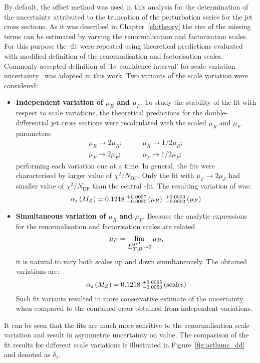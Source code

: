 By default, the offset method was used in this analysis for the determination of the uncertainty attributed to the truncation of the perturbation series for the jet cross sections. As it was described in Chapter~\ref{ch:theory} the size of the missing terms can be estimated by varying the renormalisation and factorisation scales. For this purpose the \asz-fit were repeated using theoretical predictions evaluated with modified definition of the renormalisation and factorisation scales. Commonly accepted definition of '1$\sigma$ confidence interval' for scale variation uncertainty~\cite{soper:1997} was adopted in this work. Two variants of the scale variation were considered:
\begin{itemize}
 \item \textbf{Independent variation of $\mu_R$ and $\mu_F$}. To study the stability of the fit with respect to scale variations, the theoretical predictions for the double-differential jet cross sections were recalculated with the scaled $\mu_R$ and $\mu_F$ parameters:
\begin{align}
 \mu_R \rightarrow 2\mu_R;&\qquad \mu_R \rightarrow 1/2\mu_R;\\
 \mu_F \rightarrow 2\mu_F;&\qquad \mu_F \rightarrow 1/2\mu_F;
\end{align}
performing each variation one at a time. In general, the fits were characterised by larger value of $\chi^2/N_\text{DF}$. Only the fit with $\mu_F \rightarrow 2\mu_F$ had smaller value of $\chi^2/N_\text{DF}$ than the central \asz-fit. The resulting variation of \asz was:
\begin{equation}
 \mbox{$\alpha_{s}\left(M_{Z}\right)$} = 0.1218\;^{+0.0057}_{-0.0050}\left(\mu_R\right)\;^{+0.0003}_{-0.0003}\left(\mu_F\right)
\end{equation}
\item \textbf{Simultaneous variation of $\mu_R$ and $\mu_F$}. Because the analytic expressions for the renormalisation and factorisation scales are related
\begin{equation}
 \mu_F = \lim_{\mbox{$E_{T,B}^{jet}$} \rightarrow 0} \mu_R,
\end{equation}
it is natural to vary both scales up and down simultaneously. The obtained variations are:
\begin{equation}
 \mbox{$\alpha_{s}\left(M_{Z}\right)$} = 0.1218\;^{+0.0065}_{-0.0053}\left(\text{scales}\right)
\end{equation}
Such fit variants resulted in more conservative estimate of the uncertainty when compared to the combined error obtained from independent variations. 
\end{itemize}
It can be seen that the fits are much more sensitive to the renormalisation scale variation and result in asymmetric uncertainty on \asz value. The comparison of the fit results for different scale variations is illustrated in Figure~\ref{fig:asthunc_dd} and denoted as $\delta_1$.

